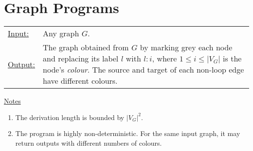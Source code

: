 \section{Graph Programs}
\label{sec:graph-programs}


\begin{tabular}{lp{10.5cm}}
\ul{Input:} & Any graph $G$. \\
\ul{Output:} & The graph obtained from $G$\/ by marking grey each node and replacing its label $l$\/ with $l{:}i$, where $1 \leq i \leq |V_G|$ is the node's \emph{colour}. The source and target of each non-loop edge have different colours.
\end{tabular}
  
\begin{center}

\end{center}

\ul{Notes}
\begin{enumerate}
\setlength{\itemsep}{-.5ex}
\item The derivation length is bounded by $|V_G|^2$.
\item The program is highly non-deterministic. For the same input graph, it may return outputs with different numbers of colours.
\end{enumerate}

